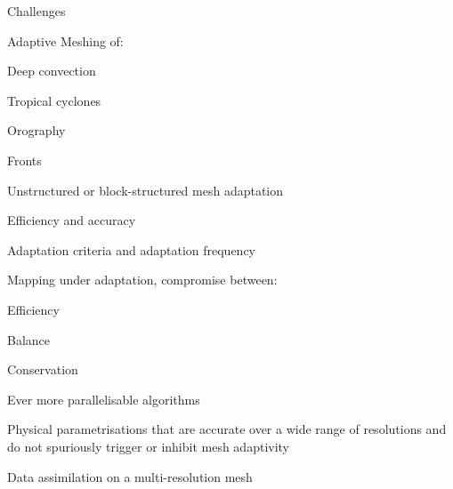 \begin{slide}{Challenges}

\begin{list0}

\item Adaptive Meshing of:
\begin{minipage}[t]{0.5\linewidth}\begin{list2m}
    \item Deep convection
    \item Tropical cyclones
    \item Orography
    \item Fronts
\end{list2m}\end{minipage}

\item Unstructured or block-structured mesh adaptation

\item Efficiency and accuracy

\item Adaptation criteria and adaptation frequency

\item Mapping under adaptation, compromise between:
\begin{minipage}[t]{0.3\linewidth}\begin{list2m}
    \item Efficiency
    \item Balance
    \item Conservation
\end{list2m}\end{minipage}

\item Ever more parallelisable algorithms

\item Physical parametrisations that are accurate over a wide range of resolutions and do not spuriously trigger or inhibit mesh adaptivity

\item Data assimilation on a multi-resolution mesh


\end{list0}

\end{slide}